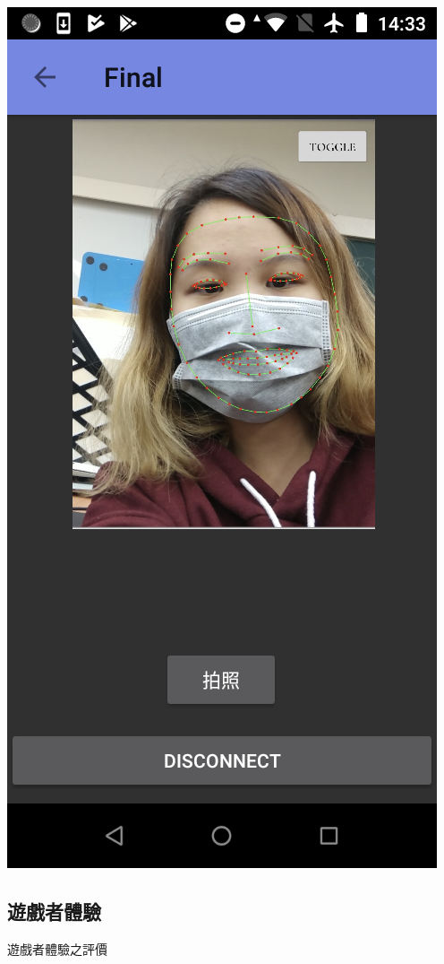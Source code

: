 \documentclass[12pt]{article}  %
\theoremstyle{plain}
\begin{document}
\begin{itemize}
\includegraphics[scale=0.265]{pic/ch4/game06.png}

\end{itemize}

\subsection{遊戲者體驗}
遊戲者體驗之評價
\newpage
\end{document}
